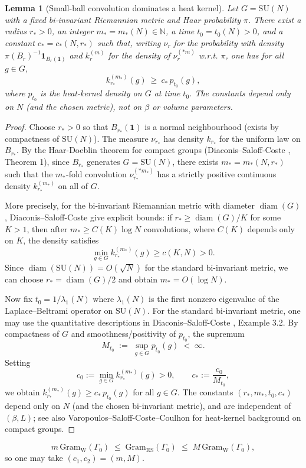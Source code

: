 \documentclass[11pt]{amsart}
\theoremstyle{plain}
\newtheorem{lemma}[theorem]{Lemma}
\theoremstyle{definition}
\theoremstyle{remark}
\begin{document}
\begin{lemma}[Small-ball convolution dominates a heat kernel]\label{lem:ball-conv-lower}
Let $G=\mathrm{SU}(N)$ with a fixed bi-invariant Riemannian metric and Haar probability $\pi$. There exist a radius $r_*>0$, an integer $m_*=m_*(N)\in\mathbb N$, a time $t_0=t_0(N)>0$, and a constant $c_*=c_*(N,r_*)$ such that, writing $\nu_r$ for the probability with density $\pi(B_r)^{-1}\mathbf 1_{B_r(\mathbf 1)}$ and $k_{r}^{(m)}$ for the density of $\nu_r^{(*m)}$ w.r.t. $\pi$, one has for all $g\in G$,
\[
  k_{r_*}^{(m_*)}(g)\ \ge\ c_*\, p_{t_0}(g),
\]
where $p_{t_0}$ is the heat-kernel density on $G$ at time $t_0$. The constants depend only on $N$ (and the chosen metric), not on $\beta$ or volume parameters.
\end{lemma}
\begin{proof}
Choose $r_*>0$ so that $B_{r_*}(\mathbf 1)$ is a normal neighbourhood (exists by compactness of $\mathrm{SU}(N)$). The measure $\nu_{r_*}$ has density $k_{r_*}$ for the uniform law on $B_{r_*}$. By the Haar-Doeblin theorem for compact groups (Diaconis--Saloff-Coste \cite{DiaconisSaloffCoste2004}, Theorem 1), since $B_{r_*}$ generates $G=\mathrm{SU}(N)$, there exists $m_*=m_*(N,r_*)$ such that the $m_*$-fold convolution $\nu_{r_*}^{(*m_*)}$ has a strictly positive continuous density $k_{r_*}^{(m_*)}$ on all of $G$.

More precisely, for the bi-invariant Riemannian metric with diameter $\operatorname{diam}(G)$, Diaconis--Saloff-Coste give explicit bounds: if $r_* \ge \operatorname{diam}(G)/K$ for some $K>1$, then after $m_* \ge C(K)\log N$ convolutions, where $C(K)$ depends only on $K$, the density satisfies
\[
  \min_{g\in G} k_{r_*}^{(m_*)}(g) \ge c(K,N) > 0.
\]
Since $\operatorname{diam}(\mathrm{SU}(N)) = O(\sqrt{N})$ for the standard bi-invariant metric, we can choose $r_* = \operatorname{diam}(G)/2$ and obtain $m_* = O(\log N)$.

Now fix $t_0 = 1/\lambda_1(N)$ where $\lambda_1(N)$ is the first nonzero eigenvalue of the Laplace--Beltrami operator on $\mathrm{SU}(N)$. For the standard bi-invariant metric, one may use the quantitative descriptions in Diaconis--Saloff-Coste \cite{DiaconisSaloffCoste2004}, Example 3.2. By compactness of $G$ and smoothness/positivity of $p_{t_0}$, the supremum
\[
  M_{t_0} \;:=\; \sup_{g\in G} p_{t_0}(g) \;<\; \infty.
\]
Setting
\[
  c_0 := \min_{g\in G} k_{r_*}^{(m_*)}(g) > 0, \qquad c_* := \frac{c_0}{M_{t_0}},
\]
we obtain $k_{r_*}^{(m_*)}(g) \ge c_*\, p_{t_0}(g)$ for all $g \in G$. The constants $(r_*, m_*, t_0, c_*)$ depend only on $N$ (and the chosen bi-invariant metric), and are independent of $(\beta,L)$; see also Varopoulos--Saloff-Coste--Coulhon \cite{VaropoulosSaloffCosteCoulhon1992} for heat-kernel background on compact groups.
\end{proof}
\[
  m\,\mathrm{Gram}_{\mathrm{W}}(\Gamma_0)\;\le\;\mathrm{Gram}_{\mathrm{RS}}(\Gamma_0)\;\le\;M\,\mathrm{Gram}_{\mathrm{W}}(\Gamma_0),
\]
so one may take $(c_1,c_2)=(m,M)$.
\end{document}
